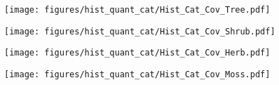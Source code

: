 \begin{multicols}{3}
    \begin{minipage}{\columnwidth}
        \begin{figure}[H]
            \texttt{[image: figures/hist\_quant\_cat/Hist\_Cat\_Cov\_Tree.pdf]}
        \end{figure} 
    \end{minipage}
    
    \begin{minipage}{\columnwidth}
        \begin{figure}[H]
            \texttt{[image: figures/hist\_quant\_cat/Hist\_Cat\_Cov\_Shrub.pdf]}
        \end{figure} 
    \end{minipage}
    
    \begin{minipage}{\columnwidth}
        \begin{figure}[H]
            \hspace{0.8cm}\centering
            \texttt{[image: figures/hist\_quant\_cat/Hist\_Cat\_Cov\_Herb.pdf]}
        \end{figure} 
    \end{minipage}

    \begin{minipage}{\columnwidth}
        \begin{figure}[H]
            \hspace{0.8cm}\centering
            \texttt{[image: figures/hist\_quant\_cat/Hist\_Cat\_Cov\_Moss.pdf]}
        \end{figure} 
    \end{minipage}


\end{multicols}
